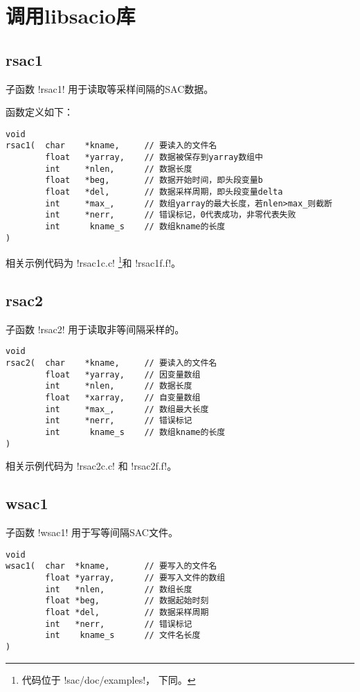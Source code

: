 \section{调用libsacio库}
\label{sec:libsacio}
\subsection{rsac1}
子函数 !rsac1! 用于读取等采样间隔的SAC数据。

函数定义如下：
\begin{verbatim}
void
rsac1(  char    *kname,     // 要读入的文件名
        float   *yarray,    // 数据被保存到yarray数组中
        int     *nlen,      // 数据长度
        float   *beg,       // 数据开始时间，即头段变量b
        float   *del,       // 数据采样周期，即头段变量delta
        int     *max_,      // 数组yarray的最大长度，若nlen>max_则截断
        int     *nerr,      // 错误标记，0代表成功，非零代表失败
        int      kname_s    // 数组kname的长度
)
\end{verbatim}

相关示例代码为 !rsac1c.c! \footnote{代码位于 !sac/doc/examples!，
下同。}和 !rsac1f.f!。

\subsection{rsac2}
子函数 !rsac2! 用于读取非等间隔采样的。
\begin{verbatim}
void
rsac2(  char    *kname,     // 要读入的文件名
        float   *yarray,    // 因变量数组
        int     *nlen,      // 数据长度
        float   *xarray,    // 自变量数组
        int     *max_,      // 数组最大长度
        int     *nerr,      // 错误标记
        int      kname_s    // 数组kname的长度
)
\end{verbatim}
相关示例代码为 !rsac2c.c! 和 !rsac2f.f!。

\subsection{wsac1}
子函数 !wsac1! 用于写等间隔SAC文件。
\begin{verbatim}
void
wsac1(  char  *kname,       // 要写入的文件名
        float *yarray,      // 要写入文件的数组
        int   *nlen,        // 数组长度
        float *beg,         // 数据起始时刻
        float *del,         // 数据采样周期
        int   *nerr,        // 错误标记
        int    kname_s      // 文件名长度
)
\end{verbatim}

